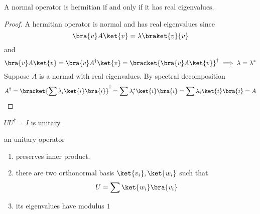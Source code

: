 \begin{theorem}
    A normal operator is hermitian if and only if it has real eigenvalues.
\end{theorem}
\begin{proof}
    A hermitian operator is normal and has real eigenvalues since
    \begin{equation*}
        \bra{v} A \ket{v} = \lambda \braket{v}{v}
    \end{equation*} 
    and 
    \begin{equation*}
        \bra{v} A \ket{v} = \bra{v} A^{\dagger} \ket{v} = \bracket{\bra{v} A \ket{v}}^{\dagger} \implies \lambda = \lambda^{\ast}
    \end{equation*}
    Suppose \(A\) is a normal with real eigenvalues. By spectral decomposition
    \begin{equation*}
        A^{\dagger} = \bracket{\sum \lambda_i \ket{i} \bra{i}}^{\dagger} =  \sum \lambda^{\ast}_i \ket{i} \bra{i} = \sum \lambda_i \ket{i} \bra{i} = A
    \end{equation*}
\end{proof}
\(UU^{\dagger} = I\) is unitary.
\begin{proposition}
    an unitary operator
    \begin{enumerate}
        \item  preserves inner product.
        \item there are two orthonormal basis \(\ket{v_i}, \ket{w_i}\) such that 
        \begin{equation*}
            U = \sum \ket{w_i} \bra{v_i}
        \end{equation*}
        \item its eigenvalues have modulus \(1\)
        
    \end{enumerate}
\end{proposition}
